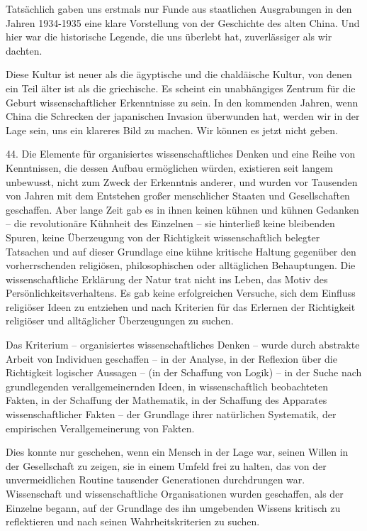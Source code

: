 \documentclass[11pt,a4paper]{book}
\begin{document}
Tatsächlich gaben uns erstmals nur Funde aus staatlichen Ausgrabungen in den Jahren 1934-1935 eine klare Vorstellung von der Geschichte des alten China. Und hier war die historische Legende, die uns überlebt hat, zuverlässiger als wir dachten. 

Diese Kultur ist neuer als die ägyptische und die chaldäische Kultur, von denen ein Teil älter ist als die griechische. Es scheint ein unabhängiges Zentrum für die Geburt wissenschaftlicher Erkenntnisse zu sein. In den kommenden Jahren, wenn China die Schrecken der japanischen Invasion überwunden hat, werden wir in der Lage sein, uns ein klareres Bild zu machen. Wir können es jetzt nicht geben. 

44. Die Elemente für organisiertes wissenschaftliches Denken und eine Reihe von Kenntnissen, die dessen Aufbau ermöglichen würden, existieren seit langem unbewusst, nicht zum Zweck der Erkenntnis anderer, und wurden vor Tausenden von Jahren mit dem Entstehen großer menschlicher Staaten und Gesellschaften geschaffen. Aber lange Zeit gab es in ihnen keinen kühnen und kühnen Gedanken -- die revolutionäre Kühnheit des Einzelnen -- sie hinterließ keine bleibenden Spuren, keine Überzeugung von der Richtigkeit wissenschaftlich belegter Tatsachen und auf dieser Grundlage eine kühne kritische Haltung gegenüber den vorherrschenden religiösen, philosophischen oder alltäglichen Behauptungen. Die wissenschaftliche Erklärung der Natur trat nicht ins Leben, das Motiv des Persönlichkeitsverhaltens. Es gab keine erfolgreichen Versuche, sich dem Einfluss religiöser Ideen zu entziehen und nach Kriterien für das Erlernen der Richtigkeit religiöser und alltäglicher Überzeugungen zu suchen. 

Das Kriterium -- organisiertes wissenschaftliches Denken -- wurde durch abstrakte Arbeit von Individuen geschaffen -- in der Analyse, in der Reflexion über die Richtigkeit logischer Aussagen -- (in der Schaffung von Logik) -- in der Suche nach grundlegenden verallgemeinernden Ideen, in wissenschaftlich beobachteten Fakten, in der Schaffung der Mathematik, in der Schaffung des Apparates wissenschaftlicher Fakten -- der Grundlage ihrer natürlichen Systematik, der empirischen Verallgemeinerung von Fakten. 

Dies konnte nur geschehen, wenn ein Mensch in der Lage war, seinen Willen in der Gesellschaft zu zeigen, sie in einem Umfeld frei zu halten, das von der unvermeidlichen Routine tausender Generationen durchdrungen war. Wissenschaft und wissenschaftliche Organisationen wurden geschaffen, als der Einzelne begann, auf der Grundlage des ihn umgebenden Wissens kritisch zu reflektieren und nach seinen Wahrheitskriterien zu suchen. 
\end{document}
